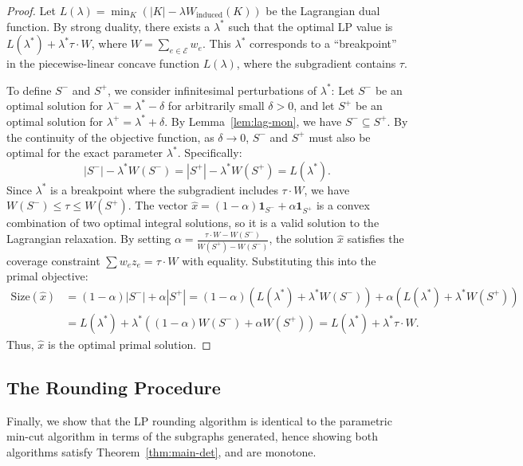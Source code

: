 \begin{proof}
Let $L(\lambda) = \min_{K} (|K| - \lambda W_{\text{induced}}(K))$ be the Lagrangian dual function. By strong duality, there exists a $\lambda^*$ such that the optimal LP value is $L(\lambda^*) + \lambda^* \tau \cdot W$, where $W = \sum_{e \in \mathcal E} w_e$.
This $\lambda^*$ corresponds to a ``breakpoint'' in the piecewise-linear concave function $L(\lambda)$, where the subgradient contains $\tau$.

To define $S^-$ and $S^+$, we consider infinitesimal perturbations of $\lambda^*$: Let $S^-$ be an optimal solution for $\lambda^- = \lambda^* - \delta$ for arbitrarily small $\delta > 0$, and let $S^+$ be an optimal solution for $\lambda^+ = \lambda^* + \delta$. By Lemma~\ref{lem:lag-mon}, we have $S^- \subseteq S^+$. By the continuity of the objective function, as $\delta \to 0$, $S^-$ and $S^+$ must also be optimal for the exact parameter $\lambda^*$. Specifically:
\[ |S^-| - \lambda^* W(S^-) = |S^+| - \lambda^* W(S^+) = L(\lambda^*). \]
Since $\lambda^*$ is a breakpoint where the subgradient includes $\tau \cdot W$, we have $W(S^-) \le \tau \le W(S^+)$.
The vector $\hat{x} = (1-\alpha)\mathbf{1}_{S^-} + \alpha\mathbf{1}_{S^+}$ is a convex combination of two optimal integral solutions, so it is a valid solution to the Lagrangian relaxation.
By setting $\alpha = \frac{\tau \cdot W - W(S^-)}{W(S^+) - W(S^-)}$, the solution $\hat{x}$ satisfies the coverage constraint $\sum w_e z_e = \tau \cdot W$ with equality.
Substituting this into the primal objective:
\begin{align*}
    \text{Size}(\hat{x}) &= (1-\alpha)|S^-| + \alpha|S^+|  = (1-\alpha)(L(\lambda^*) + \lambda^* W(S^-)) + \alpha(L(\lambda^*) + \lambda^* W(S^+)) \\
    &= L(\lambda^*) + \lambda^* \left( (1-\alpha)W(S^-) + \alpha W(S^+) \right) = L(\lambda^*) + \lambda^* \tau \cdot W.
\end{align*}
Thus, $\hat{x}$ is the optimal primal solution.
\end{proof}

\subsection{The Rounding Procedure}

Finally, we show that the LP rounding algorithm is identical to the parametric min-cut algorithm in terms of the subgraphs generated, hence showing both algorithms satisfy Theorem~\ref{thm:main-det}, and are monotone.


